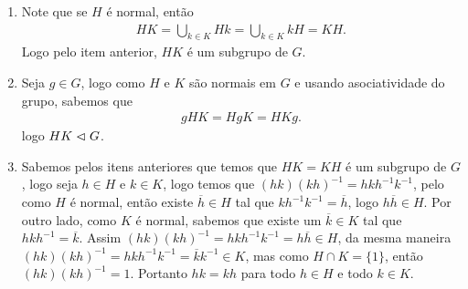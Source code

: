 \begin{homeworkProblem}
\begin{solution}
\begin{enumerate}
      Seja $a\in KH$, logo existen $k\in K$ e $h\in H$ taes que $a=kh$, assim $a^{-1}=h^{-1}k^{-1}\in HK$, mas como $HK$ é subgrupo, então $a\in HK$, por tanto podemos afirmar que $HK\subseteq KH$ e se pode concluir que $HK=KH$.

      (\textbf{Necessário}) Vamos verificar as condições.
      \begin{itemize}
        \item Fechadura.
          Seja $a,b\in HK$, logo existen $h_1,h_2\in H$ y $k_1,k_2\in K$ taes que $a=h_1k_1$ e $b=h_2k_2$, logo $ab=h_1k_1h_2k_2$, pero como $k_1h_2\in KH$ e $KH=HK$ sabemos que existen $h_3\in H$ e $k_3\in K$ taes que $k_1h_2=h_3k_3$, logo $ab=h_1h_3k_3k_2\in HK$.
        \item Existencia de elemento identidade.
          Sabemos que $1\in H$ e $1\in K$, logo $11=1\in HK$.
        \item Existencia de elemento inverso.
          Seja $a\in HK$, então existen $h\in H$ e $k\in K$ taes que $a=hk$, logo $a^{-1}=k^{-1}h^{-1}\in KH$, mas como $KH=HK$, então $a^{-1}\in HK$.
        \item Asociatividade.
          Isso é garantido pela associatividade da operação do grupo.
      \end{itemize}
      Logo $HK$ é um subgrupo de $G$.
    \item Note que se $H$ é normal, então
      \begin{align*}
        HK=\bigcup_{k\in K}Hk=\bigcup_{k\in K}kH=KH.
      \end{align*}
      Logo pelo item anterior, $HK$ é um subgrupo de $G$.
    \item Seja $g\in G$, logo como $H$ e $K$ são normais em $G$ e usando asociatividade do grupo, sabemos que
      \begin{align*}
        gHK=HgK=HKg.
      \end{align*}
      logo $HK\vartriangleleft G$.
    \item Sabemos pelos itens anteriores que temos que $HK=KH$ é um subgrupo de $G$, logo seja $h\in H$ e $k\in K$, logo temos que $(hk)(kh)^{-1}=hkh^{-1}k^{-1}$, pelo como $H$ é normal, então existe $\overline{h}\in H$ tal que $kh^{-1}k^{-1}=\overline{h}$, logo $h\overline{h}\in H$. Por outro lado, como $K$ é normal, sabemos que existe um $\overline{k}\in K$ tal que $hkh^{-1}=\overline{k}$. Assim $(hk)(kh)^{-1}=hkh^{-1}k^{-1}=h\overline{h}\in H$, da mesma maneira $(hk)(kh)^{-1}=hkh^{-1}k^{-1}=\overline{k}k^{-1}\in K$, mas como $H\cap K=\{1\}$, então $(hk)(kh)^{-1}=1$. Portanto $hk=kh$ para todo $h\in H$ e todo $k\in K$. 
  \end{enumerate}
  \end{solution}
\end{homeworkProblem}
